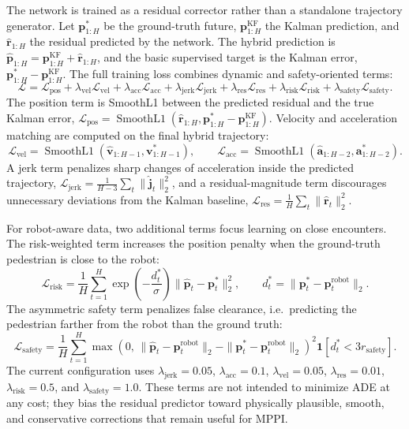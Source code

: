 \documentclass[12pt, a4paper]{article}
\begin{document}
The network is trained as a residual corrector rather than a standalone trajectory generator. Let $\mathbf{p}^{*}_{1:H}$ be the ground-truth future, $\mathbf{p}^{\mathrm{KF}}_{1:H}$ the Kalman prediction, and $\hat{\mathbf{r}}_{1:H}$ the residual predicted by the network. The hybrid prediction is $\hat{\mathbf{p}}_{1:H}=\mathbf{p}^{\mathrm{KF}}_{1:H}+\hat{\mathbf{r}}_{1:H}$, and the basic supervised target is the Kalman error, $\mathbf{p}^{*}_{1:H}-\mathbf{p}^{\mathrm{KF}}_{1:H}$. The full training loss combines dynamic and safety-oriented terms:
\[
\mathcal{L}
=
\mathcal{L}_{\text{pos}}
+\lambda_{\text{vel}}\mathcal{L}_{\text{vel}}
+\lambda_{\text{acc}}\mathcal{L}_{\text{acc}}
+\lambda_{\text{jerk}}\mathcal{L}_{\text{jerk}}
+\lambda_{\text{res}}\mathcal{L}_{\text{res}}
+\lambda_{\text{risk}}\mathcal{L}_{\text{risk}}
+\lambda_{\text{safety}}\mathcal{L}_{\text{safety}}.
\]
The position term is SmoothL1 between the predicted residual and the true Kalman error,
$\mathcal{L}_{\text{pos}}=\operatorname{SmoothL1}(\hat{\mathbf{r}}_{1:H},\mathbf{p}^{*}_{1:H}-\mathbf{p}^{\mathrm{KF}}_{1:H})$.
Velocity and acceleration matching are computed on the final hybrid trajectory:
\[
\mathcal{L}_{\text{vel}}
=
\operatorname{SmoothL1}(\hat{\mathbf{v}}_{1:H-1},\mathbf{v}^{*}_{1:H-1}),
\qquad
\mathcal{L}_{\text{acc}}
=
\operatorname{SmoothL1}(\hat{\mathbf{a}}_{1:H-2},\mathbf{a}^{*}_{1:H-2}).
\]
A jerk term penalizes sharp changes of acceleration inside the predicted trajectory, $\mathcal{L}_{\text{jerk}}=\tfrac{1}{H-3}\sum_t\|\hat{\mathbf{j}}_t\|_2^2$, and a residual-magnitude term discourages unnecessary deviations from the Kalman baseline, $\mathcal{L}_{\text{res}}=\tfrac{1}{H}\sum_t\|\hat{\mathbf{r}}_t\|_2^2$.

For robot-aware data, two additional terms focus learning on close encounters. The risk-weighted term increases the position penalty when the ground-truth pedestrian is close to the robot:
\[
\mathcal{L}_{\text{risk}}
=
\frac{1}{H}\sum_{t=1}^{H}
\exp\!\left(-\frac{d_t^{*}}{\sigma}\right)
\|\hat{\mathbf{p}}_t-\mathbf{p}^{*}_t\|_2^2,
\qquad
d_t^{*}=\|\mathbf{p}^{*}_t-\mathbf{p}^{\mathrm{robot}}_t\|_2.
\]
The asymmetric safety term penalizes false clearance, i.e.\ predicting the pedestrian farther from the robot than the ground truth:
\[
\mathcal{L}_{\text{safety}}
=
\frac{1}{H}\sum_{t=1}^{H}
\max\!\left(0,\,
\|\hat{\mathbf{p}}_t-\mathbf{p}^{\mathrm{robot}}_t\|_2
-
\|\mathbf{p}^{*}_t-\mathbf{p}^{\mathrm{robot}}_t\|_2
\right)^2
\mathbf{1}\!\left[d_t^{*}<3r_{\text{safety}}\right].
\]
The current configuration uses $\lambda_{\text{jerk}}=0.05$, $\lambda_{\text{acc}}=0.1$, $\lambda_{\text{vel}}=0.05$, $\lambda_{\text{res}}=0.01$, $\lambda_{\text{risk}}=0.5$, and $\lambda_{\text{safety}}=1.0$. These terms are not intended to minimize ADE at any cost; they bias the residual predictor toward physically plausible, smooth, and conservative corrections that remain useful for MPPI.
\end{document}

